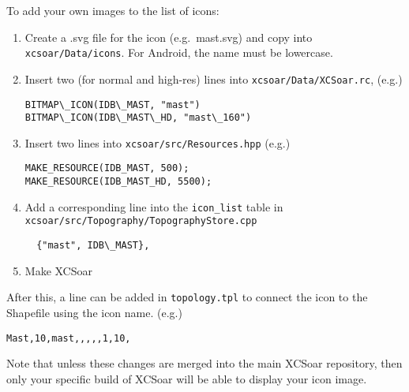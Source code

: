 To add your own images to the list of icons:
\begin{enumerate}
\item Create a .svg file for the icon (e.g.\ mast.svg) and copy into \texttt{xcsoar/Data/icons}. For Android, the name must be lowercase.
\item Insert two (for normal and high-res) lines into \texttt{xcsoar/Data/XCSoar.rc},  (e.g.)
\begin{verbatim}
BITMAP\_ICON(IDB\_MAST, "mast")
BITMAP\_ICON(IDB\_MAST\_HD, "mast\_160")
\end{verbatim}
\item Insert two lines into \texttt{xcsoar/src/Resources.hpp} (e.g.)
\begin{verbatim}
MAKE_RESOURCE(IDB_MAST, 500);
MAKE_RESOURCE(IDB_MAST_HD, 5500);
\end{verbatim}
\item Add a corresponding line into the \texttt{icon\_list} table in \texttt{xcsoar/src/Topography/TopographyStore.cpp}
\begin{verbatim}
  {"mast", IDB\_MAST},
\end{verbatim}
\item Make XCSoar
\end{enumerate} 
After this, a line can be added in \texttt{topology.tpl} to connect the icon to the Shapefile using the icon name. (e.g.)
\begin{verbatim}
Mast,10,mast,,,,,1,10,
\end{verbatim}

Note that unless these changes are merged into the main XCSoar repository, then only your specific build of XCSoar will be able to 
display your icon image.
